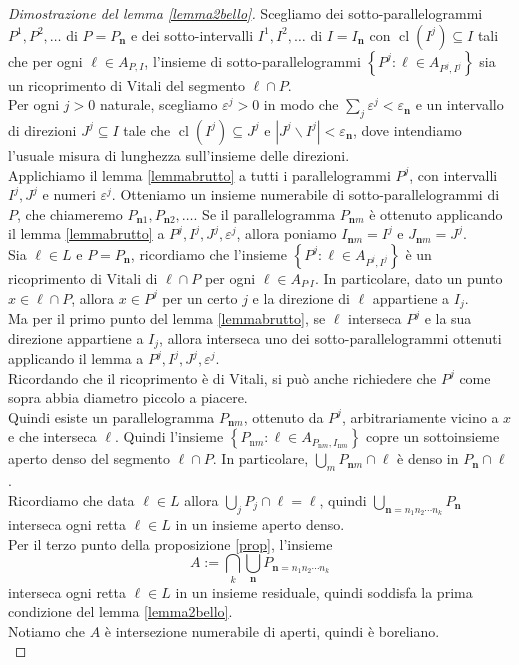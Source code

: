 \documentclass[a4paper, twoside]{article}
\newcommand{\e}{\varepsilon}
\newcommand{\<}{\langle}
\renewcommand{\>}{\rangle}
\begin{document}
\begin{proof}[Dimostrazione del lemma \ref{lemma2bello}]
Scegliamo dei sotto-parallelogrammi $P^{1}, P^{2}, \ldots$ di $P=P_{\mathbf{n}}$ e dei sotto-intervalli $I^{1}, I^{2}, \ldots$ di $I=I_{\mathbf{n}}$ con $\operatorname{cl}(I^j) \subseteq I$ tali che per ogni $\ell \in A_{P, I}$, l'insieme di sotto-parallelogrammi $\left\{P^{j}: \ell \in A_{P^{j}, I^{j}}\right\}$
sia un ricoprimento di Vitali del segmento $\ell \cap P$. \\
Per ogni $j>0$ naturale, scegliamo  $\varepsilon^{j} >0$ in modo che $\sum_j \e^j < \e_{\mathbf{n}}$ e un intervallo di direzioni $J^{j} \subseteq I$ tale che $\operatorname{cl}\left(I^{j}\right) \subseteq J^{j}$ e $\left|J^{j} \backslash I^{j}\right|<\varepsilon_\mathbf{n}$, dove intendiamo l'usuale misura di lunghezza sull'insieme delle direzioni.\\ 
Applichiamo il lemma \ref{lemmabrutto} a tutti i parallelogrammi $P^{j}$, con intervalli $I^{j}, J^{j}$ e numeri $\varepsilon^{j}$. Otteniamo un insieme numerabile di sotto-parallelogrammi di $P$, che chiameremo $P_{\mathbf{n} 1}, P_{\mathbf{n} 2}, \ldots$. Se il parallelogramma $P_{\mathbf{n} m}$ è ottenuto applicando il lemma \ref{lemmabrutto} a $P^{j}, I^{j}, J^{j}, \varepsilon^{j}$, allora poniamo $I_{\mathbf{n} m}=I^{j}$ e $J_{\mathbf{n} m}=J^{j}$.\\

Sia $\ell \in L$ e $P=P_{\mathbf{n}}$, ricordiamo che l'insieme $\left\{P^{j}: \ell \in A_{P^{j}, I^{j}}\right\}$ è un ricoprimento di Vitali di $\ell \cap P$ per ogni $\ell \in A_{P^, I}$. In particolare, dato un punto $x \in \ell \cap P$, allora $x \in P^j$ per un certo $j$ e la direzione di $\ell$ appartiene a $I_j$.\\
Ma per il primo punto del lemma \ref{lemmabrutto}, se $\ell$ interseca $P^j$ e la sua direzione appartiene a $I_j$, allora interseca uno dei sotto-parallelogrammi ottenuti applicando il lemma a $P^{j}, I^{j}, J^{j}, \varepsilon^{j}$.\\
Ricordando che il ricoprimento è di Vitali, si può anche richiedere che $P^j$ come sopra abbia diametro piccolo a piacere.\\
Quindi esiste un parallelogramma $P_{\mathbf{n}m}$, ottenuto da $P^j$, arbitrariamente vicino a $x$ e che interseca $\ell$. Quindi l'insieme $\left\{P_{\mathrm{n} m}: \ell \in A_{P_{\mathrm{n}m}, I_{\mathrm{n} m}}\right\}$
copre un sottoinsieme aperto denso del segmento $\ell \cap P$. In particolare, $\bigcup_m P_{\mathbf{n}m} \cap \ell$ è denso in $P_\mathbf{n} \cap \ell$.\\
Ricordiamo che data $\ell \in L$ allora $ \bigcup_j P_j \cap \ell = \ell $, quindi $\bigcup_{\mathbf{n}=n_{1} n_{2} \cdots n_{k}} P_{\mathbf{n}}$ interseca ogni retta $\ell \in L$ in un insieme aperto denso.\\
Per il terzo punto della proposizione \ref{prop}, l'insieme 
$$
A:= \bigcap_{k} \bigcup_{\mathbf{n}} P_{\mathbf{n}=n_{1} n_{2} \cdots n_{k}}
$$
interseca ogni retta $\ell \in L$ in un insieme residuale, quindi soddisfa la prima condizione del lemma \ref{lemma2bello}.\\
Notiamo che $A$ è intersezione numerabile di aperti, quindi è boreliano.\\


\end{proof}
\end{document}
